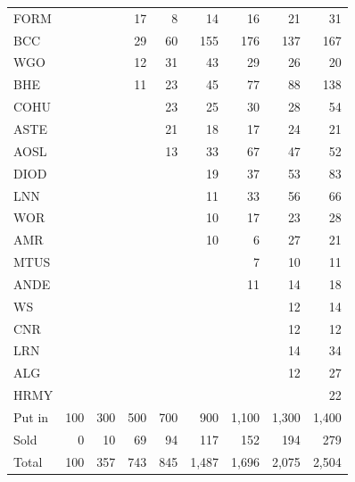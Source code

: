 \documentclass[11pt,a4paper]{article}
\begin{document}
{\begin{longtable}{l r r r r r r r r }
FORM &  &  & 17 & 8 & 14 & 16 & 21 & 31 \\
BCC &  &  & 29 & 60 & 155 & 176 & 137 & 167 \\
WGO &  &  & 12 & 31 & 43 & 29 & 26 & 20 \\
BHE &  &  & 11 & 23 & 45 & 77 & 88 & 138 \\
COHU &  &  &  & 23 & 25 & 30 & 28 & 54 \\
ASTE &  &  &  & 21 & 18 & 17 & 24 & 21 \\
AOSL &  &  &  & 13 & 33 & 67 & 47 & 52 \\
DIOD &  &  &  &  & 19 & 37 & 53 & 83 \\
LNN &  &  &  &  & 11 & 33 & 56 & 66 \\
WOR &  &  &  &  & 10 & 17 & 23 & 28 \\
AMR &  &  &  &  & 10 & 6 & 27 & 21 \\
MTUS &  &  &  &  &  & 7 & 10 & 11 \\
ANDE &  &  &  &  &  & 11 & 14 & 18 \\
WS &  &  &  &  &  &  & 12 & 14 \\
CNR &  &  &  &  &  &  & 12 & 12 \\
LRN &  &  &  &  &  &  & 14 & 34 \\
ALG &  &  &  &  &  &  & 12 & 27 \\
HRMY &  &  &  &  &  &  &  & 22 \\
\hline
Put in & 100 & 300 & 500 & 700 & 900 & 1,100 & 1,300 & 1,400 \\
Sold & 0 & 10 & 69 & 94 & 117 & 152 & 194 & 279 \\
Total & 100 & 357 & 743 & 845 & 1,487 & 1,696 & 2,075 & 2,504 \\
\hline
\end{longtable}}
\end{document}
